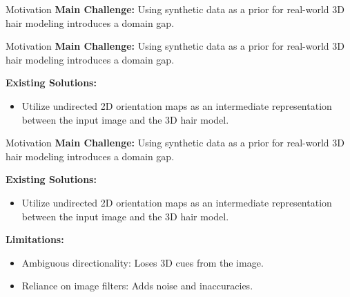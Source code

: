 
\begin{frame}[t]{Motivation}
    \textbf{Main Challenge:} Using synthetic data as a prior for real-world 3D hair modeling introduces a domain gap.
\end{frame}

\begin{frame}[t]{Motivation}
    \textbf{Main Challenge:} Using synthetic data as a prior for real-world 3D hair modeling introduces a domain gap.

    \vspace{1em}
    \textbf{Existing Solutions:} 
    \begin{itemize}
        \item Utilize undirected 2D orientation maps as an intermediate representation between the input image and the 3D hair model.
    \end{itemize}
\end{frame}

\begin{frame}[t]{Motivation}
    \textbf{Main Challenge:} Using synthetic data as a prior for real-world 3D hair modeling introduces a domain gap.

    \vspace{1em}
    \textbf{Existing Solutions:} 
    \begin{itemize}
        \item Utilize undirected 2D orientation maps as an intermediate representation between the input image and the 3D hair model.
    \end{itemize}

    \vspace{1em}
    \textbf{Limitations:}
    \begin{itemize}
        \item Ambiguous directionality: Loses 3D cues from the image.
        \item Reliance on image filters: Adds noise and inaccuracies.
    \end{itemize}
\end{frame}

